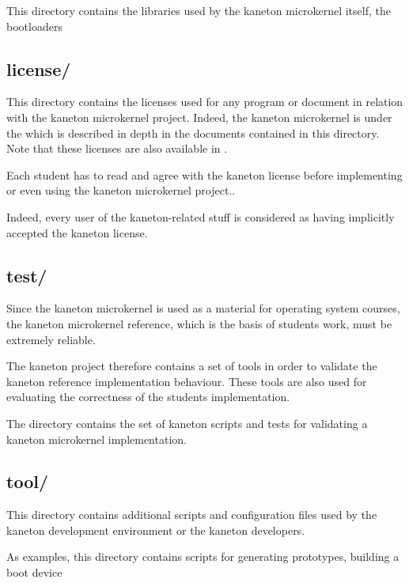 This directory contains the libraries used by the kaneton microkernel itself,
the bootloaders \etc{}

%
%

\subsection*{license/}

This directory contains the licenses used for any program or document
in relation with the kaneton microkernel project. Indeed, the kaneton
microkernel is under the  which is described in
depth in the documents contained in this directory. Note that these licenses
are also available in .

Each student has to read and agree with the kaneton license before
implementing or even using the kaneton microkernel project..

Indeed, every user of the kaneton-related stuff is considered as having
implicitly accepted the kaneton license.

%
%

\subsection*{test/}

Since the kaneton microkernel is used as a material for operating system
courses, the kaneton microkernel reference, which is the basis of students
work, must be extremely reliable.

The kaneton project therefore contains a set of tools in order to validate
the kaneton reference implementation behaviour. These tools are also used
for evaluating the correctness of the students implementation.

The  directory contains the set of kaneton scripts and tests
for validating a kaneton microkernel implementation.

%
%

\subsection*{tool/}

This directory contains additional scripts and configuration files used by
the kaneton development environment or the kaneton developers.

As examples, this directory contains scripts for generating prototypes,
building a boot device \etc{}

